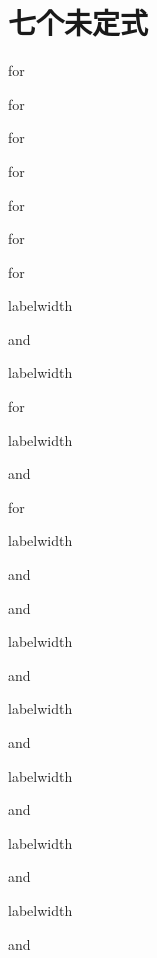 \section{七个未定式}

%
%
	\begin{homeworks}
		\item for
		\item for
		\item for
		\item for
		\item for
		\item for
		\item for
		\item labelwidth
		\item and
		\item labelwidth
		\item for
		\item labelwidth
		\item and
		\item for
		\item labelwidth
		\item and
		\item and
		\item labelwidth
		\item and
		\item labelwidth
		\item and
		\item labelwidth
		\item and
		\item labelwidth
		\item and
		\item labelwidth
		\item and
	\end{homeworks}

